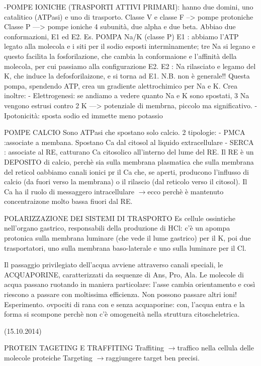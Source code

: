 \documentclass[a4paper,12pt]{article}
\newcommand{\lfreccia}{\ensuremath{\longrightarrow}}
\begin{document}
-POMPE IONICHE (TRASPORTI ATTIVI PRIMARI): hanno due domini, uno catalitico (ATPasi) e uno di trasporto.
Classe V e classe F --> pompe protoniche
Classe P ---> pompe ioniche
4 subunità, due alpha e due beta. Abbiao due conformazioni, E1 ed E2.
Es. POMPA Na/K (classe P)
E1 : abbiamo l'ATP legato alla molecola e i siti per il sodio esposti intermìnamente; tre Na si legano e questo facilita la fosforilazione, che cambia la conformaione e l'affinità della molecola, per cui passiamo alla configurazione E2.
E2 : Na rilasciato e legamo del K, che induce la defosforilaizone, e si torna ad E1.
N.B. non è generale!!
Questa pompa, spendendo ATP, crea un gradiente alettrochimico per Na e K. Crea inoltre:
- Elettrogenesi: se andiamo a vedere quanto Na e K sono spostati, 3 Na vengono estrusi contro 2 K ---> potenziale di membrna, piccolo ma significativo.
- Ipotonicità: sposta sodio ed immette meno potassio

POMPE CALCIO
Sono ATPasi che spostano solo calcio. 2 tipologie:
- PMCA :associate a membana. Spostano Ca dal citosol al liquido extracellulare
- SERCA : associate al RE, catturano Ca citosolico all'interno del lume del RE. Il RE è un DEPOSITO di calcio, perchè sia sulla membrana plasmatica che sulla membrana del reticol oabbiamo canali ionici pr il Ca che, se aperti, producono l'influsso di calcio (da fuori verso la membrana) o il rilascio (dal reticolo verso il citosol). 
Il Ca ha il ruolo di messaggero intracellulare \lfreccia ecco perchè è mantenuto  concentraizone molto bassa fiuori dal RE.

POLARIZZAZIONE DEI SISTEMI DI TRASPORTO
Es cellule ossintiche nell'organo gastrico, responsabili della produzione di HCl: c'è un apompa protonica sulla membrana luminare (che vede il lume gastrico) per il K, poi due trasportatori, uno sulla membrana baso-laterale e uno sulla luminare per il Cl.

Il passaggio privilegiato dell'acqua avviene attraverso canali speciali, le ACQUAPORINE, caratterizzati da sequenze di Ans, Pro, Ala. Le molecole di acqua passano ruotando in maniera particolare: l'asse cambia orientamento e così riescono a passare con moltissima efficienza. Non possono passare altri ioni!
Esperimento. ovpociti di rana con e senza acquaporine: con, l'acqua entra e la forma si scompone perchè non c'è omogeneità nella struttura citoscheletrica.

(15.10.2014)

PROTEIN TAGETING E TRAFFITING
Traffiting \lfreccia traffico nella cellula delle molecole proteiche
Targeting \lfreccia raggiungere target ben precisi.
\end{document}
